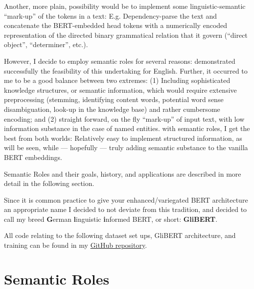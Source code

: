 Another, more plain, possibility would be to implement some linguistic-semantic ``mark-up'' of
the tokens in a text: E.g. Dependency-parse the text and concatenate the BERT-embedded head tokens
with a numerically encoded representation of the directed binary grammatical relation
that it govern (``direct object'', ``determiner'', etc.).


However, I decide to employ semantic roles for several reasons: \citeauthor{zhang2019semantics}
demonstrated successfully the feasibility of this undertaking for English. Further, it occurred to
me to be a good balance between two extremes: (1) Including sophisticated knowledge structures, or
semantic information, which would require extensive preprocessing (stemming, identifying content
words, potential word sense disambiguation, look-up in the knowledge base) and rather cumbersome
encoding; and (2) straight forward, on the fly ``mark-up'' of input text, with low information
substance in the case of named entities. with semantic roles, I get the best from both worlds:
Relatively easy to implement structured information, as will be seen, while --- hopefully ---
truly adding semantic substance to the vanilla BERT embeddings.

Semantic Roles and their goals, history, and applications are described in more detail
in the following section.

Since it is common practice to give your enhanced/variegated BERT architecture an appropriate
name I decided to not deviate from this tradition, and decided to call my breed \textbf{G}erman
\textbf{l}inguistic \textbf{i}nformed BERT, or short: \textbf{GliBERT}.

All code relating to the following dataset set ups, GliBERT architecture, and training can be found in
my \href{https://github.com/JonathanSchaber/Masterarbeit}{GitHub repository}.


\section{Semantic Roles}
\label{sec:semantic-roles}


